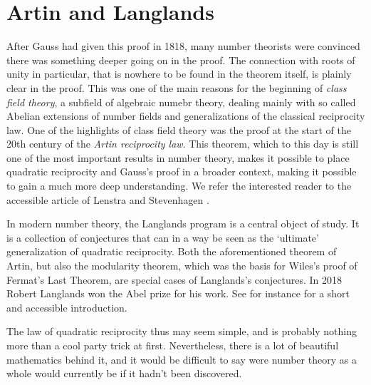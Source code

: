 \documentclass[11pt]{amsart}
\begin{document}
\section{Artin and Langlands}
After Gauss had given this proof in 1818, many number theorists were convinced there was something deeper going on in the proof. The connection with roots of unity in particular, that is nowhere to be found in the theorem itself, is plainly clear in the proof. 
This was one of the main reasons for the beginning of \emph{class field theory}, a subfield of algebraic numebr theory, dealing mainly with so called Abelian extensions of number fields and generalizations of the classical reciprocity law.
One of the highlights of class field theory was the proof at the start of the 20th century of the \emph{Artin reciprocity law}. This theorem, which to this day is still one of the most important results in number theory, makes it possible to place quadratic reciprocity and Gauss's proof in a broader context, making it possible to gain a much more deep understanding. We refer the interested reader to the accessible article of Lenstra and Stevenhagen \cite{hlps}.

In modern number theory, the Langlands program is a central object of study. It is a collection of conjectures that can in a way be seen as the `ultimate' generalization of quadratic reciprocity. Both the aforementioned theorem of Artin, but also the modularity theorem, which was the basis for Wiles's proof of Fermat's Last Theorem, are special cases of Langlands's conjectures. In 2018 Robert Langlands won the Abel prize for his work. See for instance \cite{as} for a short and accessible introduction.

The law of quadratic reciprocity thus may seem simple, and is probably nothing more than a cool party trick at first. Nevertheless, there is a lot of beautiful mathematics behind it, and it would be difficult to say were number theory as a whole would currently be if it hadn't been discovered.

\printbibliography
\end{document}
